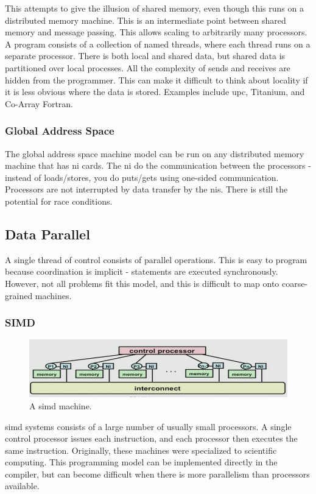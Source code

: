 \documentclass[10pt]{article}
\begin{document}
\begin{flushleft}
This attempts to give the illusion of shared memory, even though this runs on a distributed memory machine. This is an intermediate point between shared memory and message passing. This allows scaling to arbitrarily many processors. A program consists of a collection of named threads, where each thread runs on a separate processor. There is both local and shared data, but shared data is partitioned over local processes. All the complexity of sends and receives are hidden from the programmer. This can make it difficult to think about locality if it is less obvious where the data is stored. Examples include \gls{upc}, Titanium, and Co-Array Fortran. 

\subsubsection{Global Address Space}

The global address space machine model can be run on any distributed memory machine that has \gls{ni} cards. The \gls{ni} do the communication between the processors - instead of loads/stores, you do puts/gets using one-sided communication. Processors are not interrupted by data transfer by the \gls{ni}s. There is still the potential for race conditions. 

\subsection{Data Parallel}

A single thread of control consists of parallel operations. This is easy to program because coordination is implicit - statements are executed synchronously. However, not all problems fit this model, and this is difficult to map onto coarse-grained machines.

\subsubsection{SIMD}

\begin{figure}[H]
\centering
\includegraphics[width=0.5\linewidth]{figures/simd.pdf}
\caption{A \gls{simd} machine.}
\end{figure}

\gls{simd} systems consists of a large number of usually small processors. A single control processor issues each instruction, and each processor then executes the same instruction. Originally, these machines were specialized to scientific computing. This programming model can be implemented directly in the compiler, but can become difficult when there is more parallelism than processors available.


\end{flushleft}
\end{document}
